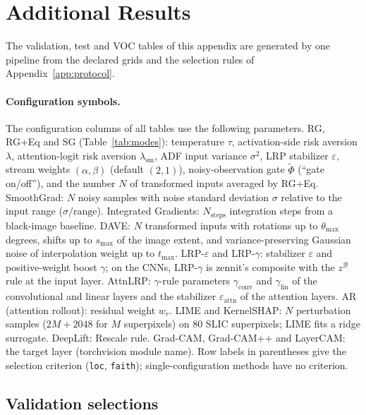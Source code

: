 \documentclass[twoside]{article}
\newcommand{\1}{\mathbf{1}}
\begin{document}
\section{Additional Results}\label{app:results}

The validation, test and VOC tables of this appendix are generated by one pipeline from the
declared grids and the selection rules of Appendix~\ref{app:protocol}.

\paragraph{Configuration symbols.}\label{app:config-symbols}
The configuration columns of all tables use the following parameters. \ac{RG}, \ac{RG}+Eq and
\ac{SG} (Table~\ref{tab:modes}): temperature $\tau$, activation-side risk aversion $\lambda$,
attention-logit risk aversion $\lambda_{\mathrm{sm}}$, \ac{ADF} input variance $\sigma^2$, \ac{LRP}
stabilizer $\varepsilon$, stream weights $(\alpha,\beta)$ (default $(2,1)$), noisy-observation gate
$\tilde\Phi$ (``gate on/off''), and the number $N$ of transformed inputs averaged by \ac{RG}+Eq.
SmoothGrad: $N$ noisy samples with noise standard deviation $\sigma$ relative to the input range
($\sigma/\mathrm{range}$). Integrated Gradients: $N_{\mathrm{steps}}$ integration steps from a
black-image baseline. DAVE: $N$ transformed inputs with rotations up to $\theta_{\max}$ degrees,
shifts up to $s_{\max}$ of the image extent, and variance-preserving Gaussian noise of
interpolation weight up to $t_{\max}$. LRP-$\varepsilon$ and LRP-$\gamma$: stabilizer $\varepsilon$
and positive-weight boost $\gamma$; on the CNNs, LRP-$\gamma$ is zennit's composite with the
$z^{\mathcal{B}}$ rule at the input layer. AttnLRP: $\gamma$-rule parameters
$\gamma_{\mathrm{conv}}$ and $\gamma_{\mathrm{lin}}$ of the convolutional and linear layers and the
stabilizer $\varepsilon_{\mathrm{attn}}$ of the attention layers. AR (attention rollout): residual
weight $w_r$. LIME and KernelSHAP: $N$ perturbation samples ($2M{+}2048$ for $M$ superpixels) on 80
SLIC superpixels; LIME fits a ridge surrogate. DeepLift: Rescale rule. Grad-CAM, Grad-CAM++ and
LayerCAM: the target layer (torchvision module name). Row labels in parentheses give the selection
criterion (\texttt{loc}, \texttt{faith}); single-configuration methods have no criterion.

\subsection{Validation selections}\label{app:val-selection}
\end{document}
